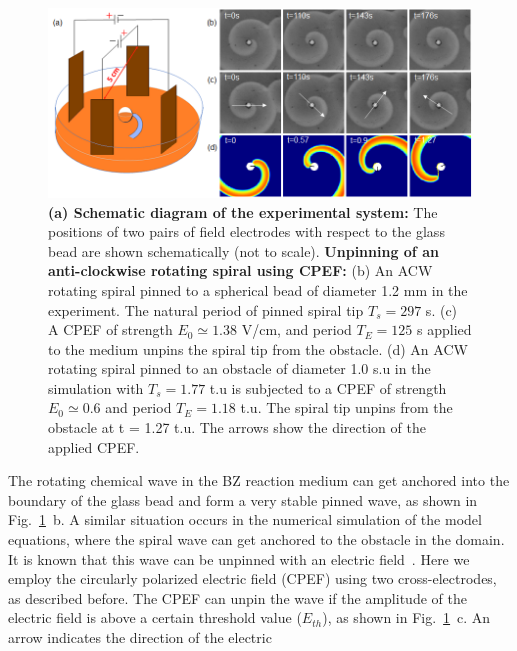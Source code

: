 \begin{figure}[htb!]
    \centering
    \includegraphics[scale=0.7]{new_fig.png}
    \caption{\textbf{(a) Schematic diagram of the experimental system:} The
	positions of two pairs of field electrodes with respect to the glass
	bead are shown schematically (not to scale).  \textbf{Unpinning of an
	anti-clockwise rotating spiral using CPEF:}  (b) An ACW rotating spiral
	pinned to a spherical bead of diameter 1.2 mm in the experiment. The
	natural period of pinned spiral tip $T_{s} = 297 $ s. (c) A CPEF of
	strength $E_0 \simeq 1.38$ V/cm, and period $T_{E} = 125$ s applied to
	the medium unpins the spiral tip from the obstacle. 
    (d) An ACW rotating spiral pinned to an obstacle of diameter 1.0 s.u in the
	simulation with $T_{s} = 1.77$ t.u is subjected to a CPEF of strength
	$E_0 \simeq 0.6 $ and period $T_{E} =1.18$ t.u. The spiral tip unpins
	from the obstacle at t = 1.27 t.u.  The arrows show the direction of
	the applied CPEF.}
    \label{fig:unpinning_images}
\end{figure}
The rotating chemical wave in the BZ reaction medium can get anchored into the
boundary of the glass bead and form a very stable pinned wave, as shown in
Fig.~\ref{fig:unpinning_images}~b.  A similar situation occurs in the
numerical simulation of the model equations, where the spiral wave can get
anchored to the obstacle in the domain. It is known that this wave can be
unpinned with an electric field~\cite{Amrutha,???}. 
Here we employ the circularly polarized electric field (CPEF) using two
cross-electrodes, as described before. The CPEF can unpin the wave if the
amplitude of the electric field is above a certain threshold value ($E_{th}$),
as shown in Fig.~\ref{fig:unpinning_images}~c.  An arrow indicates the direction of the electric

